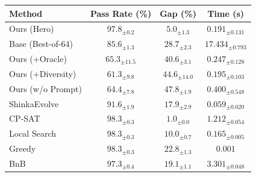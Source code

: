 \begin{tabular}{lccc}
\toprule
Method & Pass Rate (\%) & Gap (\%) & Time (s) \\
\midrule
Ours (Hero) & $97.8_{\pm 0.2}$ & $5.0_{\pm 1.3}$ & $0.191_{\pm 0.131}$ \\
Base (Best-of-64) & $85.6_{\pm 1.3}$ & $28.7_{\pm 2.3}$ & $17.434_{\pm 0.793}$ \\
Ours (+Oracle) & $65.3_{\pm 11.5}$ & $40.6_{\pm 3.1}$ & $0.247_{\pm 0.128}$ \\
Ours (+Diversity) & $61.3_{\pm 9.8}$ & $44.6_{\pm 14.0}$ & $0.195_{\pm 0.103}$ \\
Ours (w/o Prompt) & $64.4_{\pm 7.8}$ & $47.8_{\pm 1.9}$ & $0.400_{\pm 0.548}$ \\
ShinkaEvolve & $91.6_{\pm 1.9}$ & $17.9_{\pm 2.9}$ & $0.059_{\pm 0.020}$ \\
CP-SAT & $98.3_{\pm 0.3}$ & $1.0_{\pm 0.0}$ & $1.212_{\pm 0.054}$ \\
Local Search & $98.3_{\pm 0.3}$ & $10.0_{\pm 0.7}$ & $0.165_{\pm 0.005}$ \\
Greedy & $98.3_{\pm 0.3}$ & $22.8_{\pm 1.3}$ & $0.001$ \\
BnB & $97.3_{\pm 0.4}$ & $19.1_{\pm 1.1}$ & $3.301_{\pm 0.048}$ \\
\bottomrule
\end{tabular}
